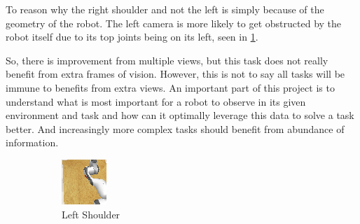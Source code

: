 To reason why the right shoulder and not the left is simply because of the geometry of the robot. The left camera is more likely to get obstructed by the robot itself due to its top joints being on its left, seen in \ref{subfig:rno-random-ls}. 

So, there is improvement from multiple views, but this task does not really benefit from extra frames of vision. However, this is not to say all tasks will be immune to benefits from extra views. An important part of this project is to understand what is most important for a robot to observe in its given environment and task and how can it optimally leverage this data to solve a task better. And increasingly more complex tasks should benefit from abundance of information.

\begin{figure}[htpb] %
  \centering
  \begin{subfigure}{0.3\linewidth}
    \centering
    \includegraphics[width=0.8\linewidth]{assets/cam-comb/reach-no-obs/demo1-step30-left_shoulder.png}
    \caption{Left Shoulder}\label{subfig:rno-random-ls}
  \end{subfigure}
  \begin{subfigure}{0.3\linewidth}
    \centering

\end{subfigure}
\end{figure}
